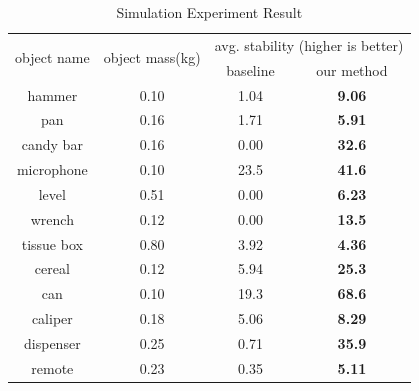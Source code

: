 \documentclass[12pt]{ucsddissertation}
\begin{document}
\begin{table}[!h]
	\centering
	\caption[Simulation Experiment Results]{Simulation Experiment Result}
	\label{sim_result}
	\begin{center}
		\begin{tabular}{|c|c|cc|}
			\hline
			\multirow{2}{*}{object name} & \multirow{2}{*}{object mass(kg)} & \multicolumn{2}{c|}{avg. stability (higher is better)}             \\ \cline{3-4} 
			&                              & \multicolumn{1}{c|}{baseline} & our method \\ \hline
			hammer                       & 0.10                          & \multicolumn{1}{c|}{1.04}        & \textbf{9.06}         \\ \hline
			pan                          & 0.16                          & \multicolumn{1}{c|}{1.71}        & \textbf{5.91}         \\ \hline
			candy bar                       & 0.16                          & \multicolumn{1}{c|}{0.00}        & \textbf{32.6}         \\ \hline
			microphone                     & 0.10                          & \multicolumn{1}{c|}{23.5}        & \textbf{41.6}         \\ \hline
			level                      & 0.51                          & \multicolumn{1}{c|}{0.00}        & \textbf{6.23}         \\ \hline
			wrench                           & 0.12                          & \multicolumn{1}{c|}{0.00}        & \textbf{13.5}         \\ \hline
			tissue box                      & 0.80                          & \multicolumn{1}{c|}{3.92}        & \textbf{4.36}         \\ \hline
			cereal                       & 0.12                          & \multicolumn{1}{c|}{5.94}        & \textbf{25.3}         \\ \hline
			can                          & 0.10                          & \multicolumn{1}{c|}{19.3}        & \textbf{68.6}         \\ \hline
			caliper                     & 0.18                          & \multicolumn{1}{c|}{5.06}        & \textbf{8.29}         \\ \hline
			dispenser                     & 0.25                          & \multicolumn{1}{c|}{0.71}        & \textbf{35.9}         \\ \hline
			remote                     & 0.23                          & \multicolumn{1}{c|}{0.35}        & \textbf{5.11}         \\ \hline
			
		\end{tabular}
	\end{center}
\end{table}
\end{document}
